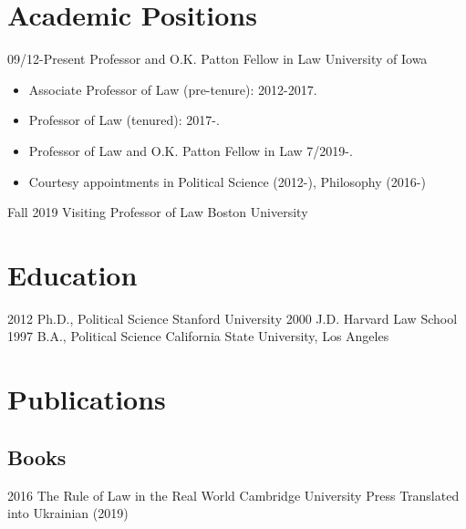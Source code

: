\documentclass[letterpaper]{moderncv}
\begin{document}
\makecvtitle

\lfoot{\thepage}

%
%
\section{Academic Positions}
\cventry
{09/12-Present}
{Professor and O.K. Patton Fellow in Law}
{University of Iowa}
{}
{}
{\begin{itemize}%
	\item Associate Professor of Law (pre-tenure): 2012-2017.
	\item Professor of Law (tenured): 2017-.
  \item Professor of Law and O.K. Patton Fellow in Law 7/2019-.
	\item Courtesy appointments in Political Science (2012-), Philosophy (2016-)
	\end{itemize}}

\cventry
{Fall 2019}
{Visiting Professor of Law}
{Boston University}
{}
{}
{}


%
%
\section{Education}
\cventry
{2012}
{Ph.D., Political Science}
{Stanford University}
{}
{}
{}
\cventry
{2000}
{J.D.}
{Harvard Law School}
{}
{}
{}
\cventry
{1997}
{B.A., Political Science}
{California State University, Los Angeles}
{}
{}
{}
%
%
\section{Publications}
\subsection{Books}
\cventry
{2016}
{The Rule of Law in the Real World}
{}
{Cambridge University Press}
{}
{Translated into Ukrainian (2019)}
\vspace{1mm}
\vspace{1mm}
\end{document}
